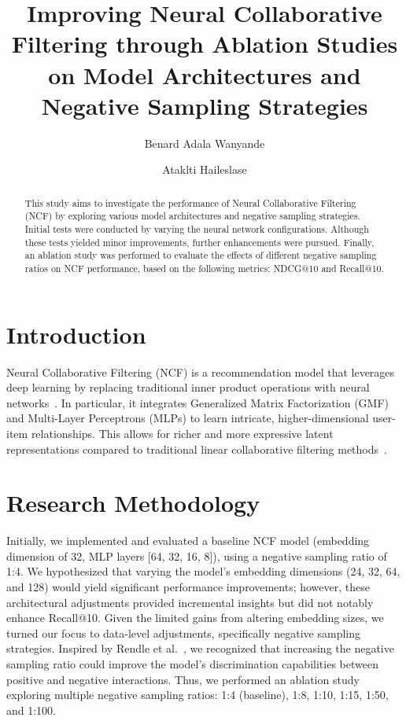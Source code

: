 \documentclass[runningheads]{llncs}
\begin{document}
\title{Improving Neural Collaborative Filtering through Ablation Studies on Model Architectures and Negative Sampling Strategies}


\author{Benard Adala Wanyande \and Ataklti Haileslase}



\maketitle

\begin{abstract}
This study aims to investigate the performance of Neural Collaborative Filtering (NCF) by exploring various model architectures and negative sampling strategies. Initial tests were conducted by varying the neural network configurations. Although these tests yielded minor improvements, further enhancements were pursued. Finally, an ablation study was performed to evaluate the effects of different negative sampling ratios on NCF performance, based on the following metrics: NDCG@10 and Recall@10.
\end{abstract}

\section{Introduction}
Neural Collaborative Filtering (NCF) is a recommendation model that leverages deep learning by replacing traditional inner product operations with neural networks~\cite{he2017neural}. In particular, it integrates Generalized Matrix Factorization (GMF)\cite{he2017neural} and Multi-Layer Perceptrons (MLPs)\cite{he2017neural} to learn intricate, higher-dimensional user-item relationships. This allows for richer and more expressive latent representations compared to traditional linear collaborative filtering methods~\cite{koren2009matrix}.

\section{Research Methodology}
Initially, we implemented and evaluated a baseline NCF model (embedding dimension of 32, MLP layers [64, 32, 16, 8]), using a negative sampling ratio of 1:4. We hypothesized that varying the model's embedding dimensions (24, 32, 64, and 128) would yield significant performance improvements; however, these architectural adjustments provided incremental insights but did not notably enhance Recall@10. Given the limited gains from altering embedding sizes, we turned our focus to data-level adjustments, specifically negative sampling strategies. Inspired by Rendle et al.~\cite{rendle2012bpr}, we recognized that increasing the negative sampling ratio could improve the model's discrimination capabilities between positive and negative interactions. Thus, we performed an ablation study exploring multiple negative sampling ratios: 1:4 (baseline), 1:8, 1:10, 1:15, 1:50, and 1:100.
\end{document}
